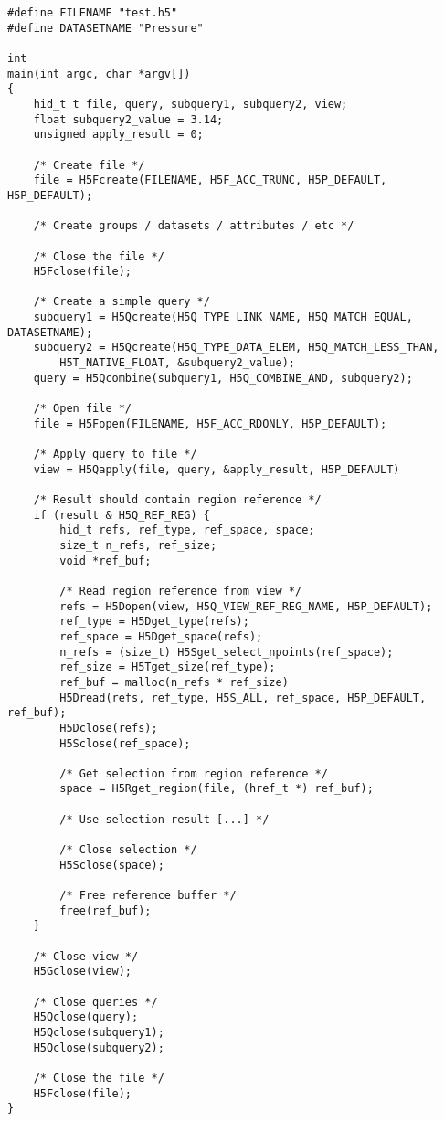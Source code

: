 {
\begin{lstlisting}
#define FILENAME "test.h5"
#define DATASETNAME "Pressure"

int
main(int argc, char *argv[])
{
    hid_t t file, query, subquery1, subquery2, view;
    float subquery2_value = 3.14;
    unsigned apply_result = 0;

    /* Create file */
    file = H5Fcreate(FILENAME, H5F_ACC_TRUNC, H5P_DEFAULT, H5P_DEFAULT);

    /* Create groups / datasets / attributes / etc */

    /* Close the file */
    H5Fclose(file);

    /* Create a simple query */
    subquery1 = H5Qcreate(H5Q_TYPE_LINK_NAME, H5Q_MATCH_EQUAL, DATASETNAME);
    subquery2 = H5Qcreate(H5Q_TYPE_DATA_ELEM, H5Q_MATCH_LESS_THAN,
        H5T_NATIVE_FLOAT, &subquery2_value);
    query = H5Qcombine(subquery1, H5Q_COMBINE_AND, subquery2);

    /* Open file */
    file = H5Fopen(FILENAME, H5F_ACC_RDONLY, H5P_DEFAULT);

    /* Apply query to file */
    view = H5Qapply(file, query, &apply_result, H5P_DEFAULT)

    /* Result should contain region reference */
    if (result & H5Q_REF_REG) {
        hid_t refs, ref_type, ref_space, space;
        size_t n_refs, ref_size;
        void *ref_buf;

        /* Read region reference from view */
        refs = H5Dopen(view, H5Q_VIEW_REF_REG_NAME, H5P_DEFAULT);
        ref_type = H5Dget_type(refs);
        ref_space = H5Dget_space(refs);
        n_refs = (size_t) H5Sget_select_npoints(ref_space);
        ref_size = H5Tget_size(ref_type);
        ref_buf = malloc(n_refs * ref_size)
        H5Dread(refs, ref_type, H5S_ALL, ref_space, H5P_DEFAULT, ref_buf);
        H5Dclose(refs);
        H5Sclose(ref_space);

        /* Get selection from region reference */
        space = H5Rget_region(file, (href_t *) ref_buf);

        /* Use selection result [...] */

        /* Close selection */
        H5Sclose(space);

        /* Free reference buffer */
        free(ref_buf);
    }

    /* Close view */
    H5Gclose(view);

    /* Close queries */
    H5Qclose(query);
    H5Qclose(subquery1);
    H5Qclose(subquery2);

    /* Close the file */
    H5Fclose(file);
}
\end{lstlisting}
}

